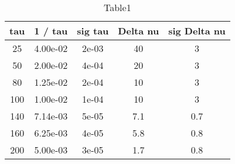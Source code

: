 \begin{table} 
 \caption{Table1}
\begin{tabular}{|*{5}{c|}}
\hline 
tau & 1 / tau & sig tau & Delta nu & sig Delta nu\\ \hline 
25 & 4.00e-02 & 2e-03 & 40 & 3 \\ \hline 
 50 & 2.00e-02 & 4e-04 & 20 & 3 \\ \hline 
 80 & 1.25e-02 & 2e-04 & 10 & 3 \\ \hline 
 100 & 1.00e-02 & 1e-04 & 10 & 3 \\ \hline 
 140 & 7.14e-03 & 5e-05 & 7.1 & 0.7 \\ \hline 
 160 & 6.25e-03 & 4e-05 & 5.8 & 0.8 \\ \hline 
 200 & 5.00e-03 & 3e-05 & 1.7 & 0.8 \\ \hline 
 \end{tabular} 
\end{table} 
